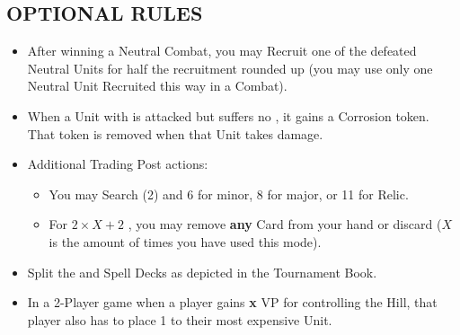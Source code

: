 \begin{multicols}{2}
\subsection*{\MakeUppercase{Optional Rules}}
\begin{itemize}
  \item After winning a Neutral Combat, you may Recruit one of the defeated Neutral Units for half the recruitment  rounded up (you may use only one Neutral Unit Recruited this way in a Combat).  %
  \item When a Unit with  is attacked but suffers no , it gains a Corrosion token. That token is removed when that Unit takes damage.
  \item Additional Trading Post actions:
  \begin{itemize}
    \item You may Search (2)  and  6  for minor, 8  for major, or 11  for Relic.
    \item For $2×X+2$ , you may remove \textbf{any} Card from your hand or discard ($X$is the amount of times you have used this mode).
  \end{itemize}
  \item Split the  and Spell Decks as depicted in the Tournament Book.
  \item In a 2-Player game when a player gains \textbf{x} VP for controlling the Hill, that player also has to place 1  to their most expensive Unit.
\end{itemize}

\end{multicols}

